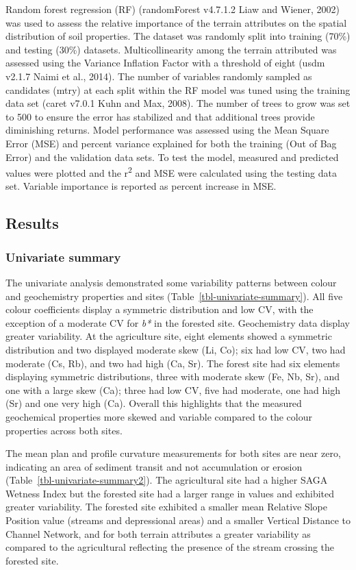 \documentclass[
  number]{elsarticle}
\begin{document}
Random forest regression (RF) (randomForest v4.7.1.2 Liaw and Wiener,
2002) was used to assess the relative importance of the terrain
attributes on the spatial distribution of soil properties. The dataset
was randomly split into training (70\%) and testing (30\%) datasets.
Multicollinearity among the terrain attributed was assessed using the
Variance Inflation Factor with a threshold of eight (usdm v2.1.7 Naimi
et al., 2014). The number of variables randomly sampled as candidates
(mtry) at each split within the RF model was tuned using the training
data set (caret v7.0.1 Kuhn and Max, 2008). The number of trees to grow
was set to 500 to ensure the error has stabilized and that additional
trees provide diminishing returns. Model performance was assessed using
the Mean Square Error (MSE) and percent variance explained for both the
training (Out of Bag Error) and the validation data sets. To test the
model, measured and predicted values were plotted and the
r\textsuperscript{2} and MSE were calculated using the testing data set.
Variable importance is reported as percent increase in MSE.

\subsection{Results}\label{results}

\subsubsection{Univariate summary}\label{univariate-summary}

The univariate analysis demonstrated some variability patterns between
colour and geochemistry properties and sites
(Table~\ref{tbl-univariate-summary}). All five colour coefficients
display a symmetric distribution and low CV, with the exception of a
moderate CV for \emph{b*} in the forested site. Geochemistry data
display greater variability. At the agriculture site, eight elements
showed a symmetric distribution and two displayed moderate skew (Li,
Co); six had low CV, two had moderate (Cs, Rb), and two had high (Ca,
Sr). The forest site had six elements displaying symmetric
distributions, three with moderate skew (Fe, Nb, Sr), and one with a
large skew (Ca); three had low CV, five had moderate, one had high (Sr)
and one very high (Ca). Overall this highlights that the measured
geochemical properties more skewed and variable compared to the colour
properties across both sites.

The mean plan and profile curvature measurements for both sites are near
zero, indicating an area of sediment transit and not accumulation or
erosion (Table~\ref{tbl-univariate-summary2}). The agricultural site had
a higher SAGA Wetness Index but the forested site had a larger range in
values and exhibited greater variability. The forested site exhibited a
smaller mean Relative Slope Position value (streams and depressional
areas) and a smaller Vertical Distance to Channel Network, and for both
terrain attributes a greater variability as compared to the agricultural
reflecting the presence of the stream crossing the forested site.
\end{document}
